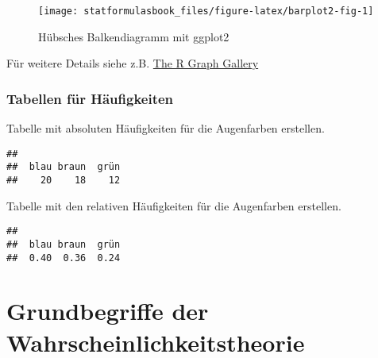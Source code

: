 \documentclass[
]{book}
\newenvironment{Shaded}{\begin{snugshade}}{\end{snugshade}}
\newcommand{\FunctionTok}[1]{\textcolor[rgb]{0.00,0.00,0.00}{#1}}
\newcommand{\NormalTok}[1]{#1}
\newcommand{\SpecialCharTok}[1]{\textcolor[rgb]{0.00,0.00,0.00}{#1}}
\begin{document}
\begin{figure}

{\centering \texttt{[image: statformulasbook\_files/figure-latex/barplot2-fig-1]} 

}

\caption{Hübsches Balkendiagramm mit ggplot2}\label{fig:barplot2-fig}
\end{figure}

Für weitere Details siehe z.B. \href{https://www.r-graph-gallery.com/barplot.html}{The R Graph Gallery}

\hypertarget{tabellen-fuxfcr-huxe4ufigkeiten}{%
\subsection{Tabellen für Häufigkeiten}\label{tabellen-fuxfcr-huxe4ufigkeiten}}

Tabelle mit absoluten Häufigkeiten für die Augenfarben erstellen.

\begin{Shaded}
\end{Shaded}

\begin{verbatim}
## 
##  blau braun  grün 
##    20    18    12
\end{verbatim}

Tabelle mit den relativen Häufigkeiten für die Augenfarben erstellen.

\begin{Shaded}
\end{Shaded}

\begin{verbatim}
## 
##  blau braun  grün 
##  0.40  0.36  0.24
\end{verbatim}

\hypertarget{grundbegriffe-der-wahrscheinlichkeitstheorie}{%
\chapter{Grundbegriffe der Wahrscheinlichkeitstheorie}\label{grundbegriffe-der-wahrscheinlichkeitstheorie}}
\end{document}
